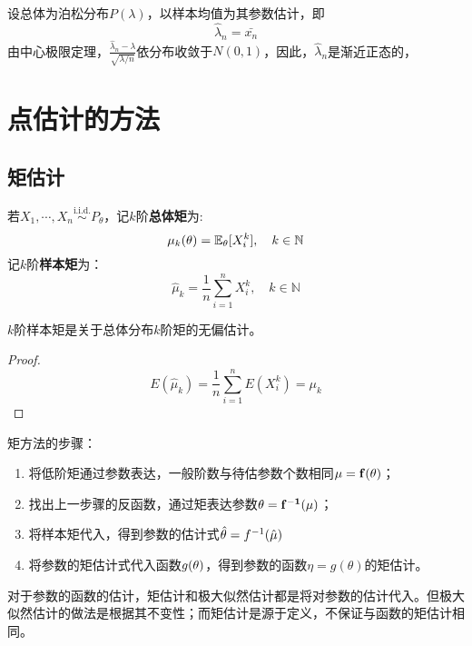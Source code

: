 \begin{example}
    设总体为泊松分布$P(\lambda)$，以样本均值为其参数估计，即
    \[ \hat\lambda_n=\bar{x_n} \]
    由中心极限定理，$\frac{\hat\lambda_n-\lambda}{\sqrt{\lambda/n}}$依分布收敛于$N(0,1)$，因此，$\hat\lambda_n$是渐近正态的，
\end{example}

\section{点估计的方法}

\subsection{矩估计}

\begin{definition}[总体矩与样本矩]
    若$X_1,\cdots ,X_n \overset{\text{i.i.d.}}{\sim} P_{\theta}$，记$k$阶\textbf{总体矩}为:
    \[ \mu_k(\theta) = \mathbb{E}_{\theta}[X_i^k] ,\quad k \in \mathbb{N} \]
    记$k$阶\textbf{样本矩}为：
    \[ \hat\mu_k=\frac1n \sum_{i=1}^n X_i^k ,\quad k \in \mathbb{N} \]
\end{definition}

\begin{proposition}[矩估计的无偏性]
    $k$阶样本矩是关于总体分布$k$阶矩的无偏估计。
\end{proposition}
\begin{proof}
    \[ E(\hat\mu_k)=\frac1n \sum_{i=1}^n E(X_i^k)=\mu_k \]
\end{proof}


矩方法的步骤：
\begin{enumerate}
    \item 将低阶矩通过参数表达，一般阶数与待估参数个数相同$\bf\mu=f(\bf\theta)$；
    \item 找出上一步骤的反函数，通过矩表达参数$\bf\theta=f^{-1}(\bf\mu)$；
    \item 将样本矩代入，得到参数的估计式$\hat{\theta}=f^{-1}(\hat{\bf\mu})$
    \item 将参数的矩估计式代入函数$g(\bf\theta)$，得到参数的函数$\eta = g(\theta)$的矩估计。
\end{enumerate}
\begin{remark}
    对于参数的函数的估计，矩估计和极大似然估计都是将对参数的估计代入。但极大似然估计的做法是根据其不变性；而矩估计是源于定义，不保证与函数的矩估计相同。
\end{remark}

